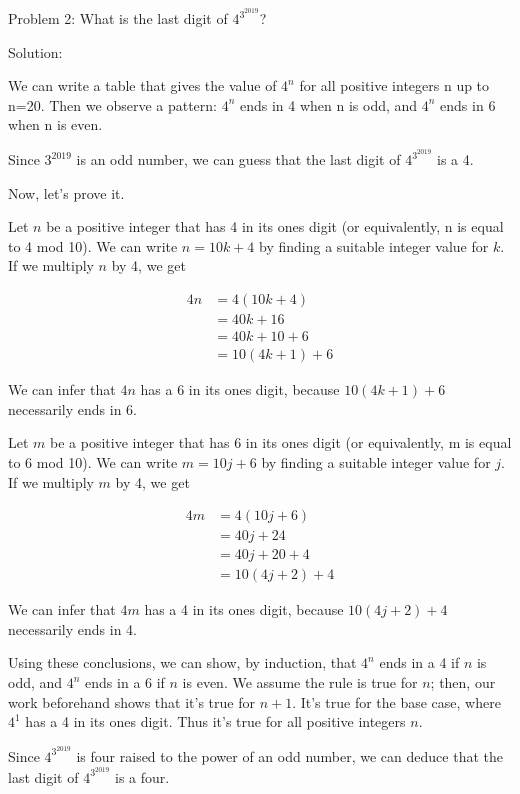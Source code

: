 Problem 2: What is the last digit of $4^{3^{2019}}$?

Solution:

We can write a table that gives the value of $4^n$ for all positive integers n up to n=20. Then we observe a pattern: $4^n$ ends in 4 when n is odd, and $4^n$ ends in 6 when n is even.

Since $3^{2019}$ is an odd number, we can guess that the last digit of $4^{3^{2019}}$ is a 4.

Now, let's prove it.

Let $n$ be a positive integer that has 4 in its ones digit (or equivalently, n is equal to 4 mod 10). We can write $n = 10k + 4$ by finding a suitable integer value for $k$. If we multiply $n$ by 4, we get

\begin{align*}
4n &= 4(10k + 4) \\
&= 40k + 16 \\
&= 40k + 10 + 6 \\
&= 10(4k + 1) + 6
\end{align*}

We can infer that $4n$ has a 6 in its ones digit, because $10(4k + 1) + 6$ necessarily ends in 6.

Let $m$ be a positive integer that has 6 in its ones digit (or equivalently, m is equal to 6 mod 10). We can write $m = 10j + 6$ by finding a suitable integer value for $j$. If we multiply $m$ by 4, we get

\begin{align*}
4m &= 4(10j + 6) \\
&= 40j + 24 \\
&= 40j + 20 + 4 \\
&= 10(4j + 2) + 4
\end{align*}

We can infer that $4m$ has a 4 in its ones digit, because $10(4j + 2) + 4$ necessarily ends in 4.

Using these conclusions, we can show, by induction, that $4^n$ ends in a 4 if $n$ is odd, and $4^n$ ends in a 6 if $n$ is even. We assume the rule is true for $n$; then, our work beforehand shows that it's true for $n+1$. It's true for the base case, where $4^1$ has a 4 in its ones digit. Thus it's true for all positive integers $n$.

Since $4^{3^{2019}}$ is four raised to the power of an odd number, we can deduce that the last digit of $4^{3^{2019}}$ is a four.
